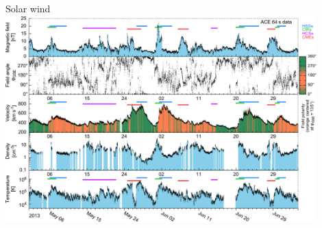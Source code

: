 \begin{frame}[plain,c]{Solar wind}{}
	\centering
	\includegraphics[width=0.9\textwidth]{../figures_of_mine/gnuplots/ACE_64s_v7_thesis_CIRs_2013-5-1_65_plot.pdf}
	
\end{frame}



% 





